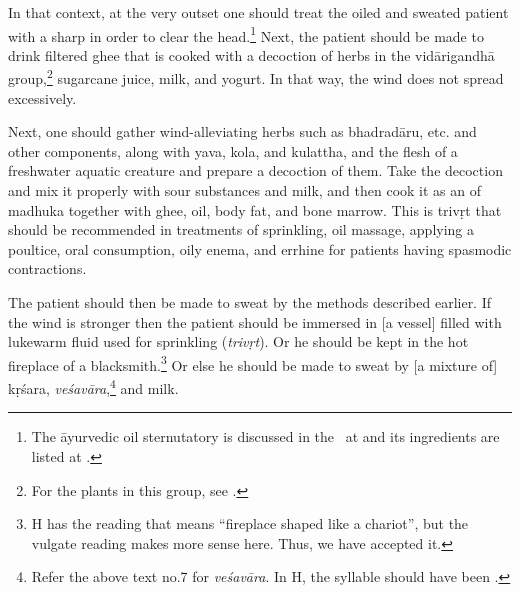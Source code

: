 \begin{translation}
%
In that context, at the very outset one should treat the oiled and
sweated patient with a sharp  in order to
clear the head.\footnote{The āyurvedic oil sternutatory is discussed in
    the \SS\  at  and its ingredients are listed at
    .} %
    Next, the patient should be made to drink filtered ghee that is cooked
    with a decoction of herbs in the \gls{vidārigandhā} group,\footnote{For
        the plants in this group, see \cite[55]{suve-2000}.} sugarcane juice,
        milk, and yogurt. In that way, the wind does not spread excessively.
        
        \newpage
        \begin{tt}
            \raggedright
            \bigskip

Next, 
one should gather wind-alleviating herbs such as
\gls{bhadradāru}, etc. and other components, along with
\gls{yava}, \gls{kola}, and \gls{kulattha}, and the flesh of a
freshwater aquatic creature 
and prepare a decoction
of them. %
Take the decoction and mix it properly with sour
substances and milk, and then cook it as an 
 of \gls{madhuka} 
    together with ghee, oil, body fat, and bone marrow. This is
    \gls{trivṛt} that should be recommended in treatments of
    sprinkling, oil massage, applying a poultice, oral consumption, oily
    enema, and errhine for patients having spasmodic contractions.

The patient should then be made to sweat by the methods described
earlier. If the wind is stronger then the patient should be immersed
in [a vessel] filled with lukewarm fluid used for sprinkling
(\textit{trivṛt}). Or he should be kept in the hot fireplace of a
blacksmith.\footnote{H has the reading  that
    means \enquote{fireplace shaped like a chariot}, but the vulgate
    reading  makes more sense here. Thus, we have
    accepted it.} Or else he should be made to sweat by [a mixture of]
    \gls{kṛśara}, \textit{veśavāra},\footnote{Refer the above text no.7
        for \textit{veśavāra}. In H, the syllable  should have been
        .} and milk.


\end{tt}
\end{translation}
